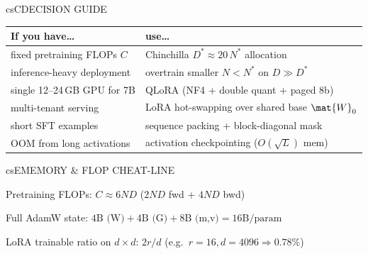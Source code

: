 \documentclass[../../../../master.tex]{subfiles}
\begin{document}
\begin{cscolumns}
\begin{cscard}{csC}{DECISION GUIDE}
  \renewcommand{\arraystretch}{1.22}\small
  \begin{tabular}{@{}>{\raggedright\arraybackslash}p{3.1cm}>{\raggedright\arraybackslash}p{4.6cm}@{}}
    \textbf{If you have\ldots} & \textbf{use\ldots}\\ \hline
    fixed pretraining FLOPs $C$ & Chinchilla $D^*\approx 20\,N^*$ allocation\\
    inference-heavy deployment & overtrain smaller $N < N^*$ on $D \gg D^*$\\
    single 12--24\,GB GPU for 7B & QLoRA (NF4 + double quant + paged 8b)\\
    multi-tenant serving & LoRA hot-swapping over shared base $\mat{W}_0$\\
    short SFT examples & sequence packing + block-diagonal mask\\
    OOM from long activations & activation checkpointing ($O(\sqrt{L})$ mem)\\
  \end{tabular}
\end{cscard}

\begin{cscard}{csE}{MEMORY \& FLOP CHEAT-LINE}
  \begin{csbul}
    \item Pretraining FLOPs: $C \approx 6ND$ ($2ND$ fwd + $4ND$ bwd)
    \item Full AdamW state: $4\text{B (W)} + 4\text{B (G)} + 8\text{B (m,v)} = 16\text{B/param}$
    \item LoRA trainable ratio on $d\times d$: $2r/d$ (e.g.\ $r=16, d=4096 \Rightarrow 0.78\%$)
  \end{csbul}
\end{cscard}


\end{cscolumns}
\end{document}
